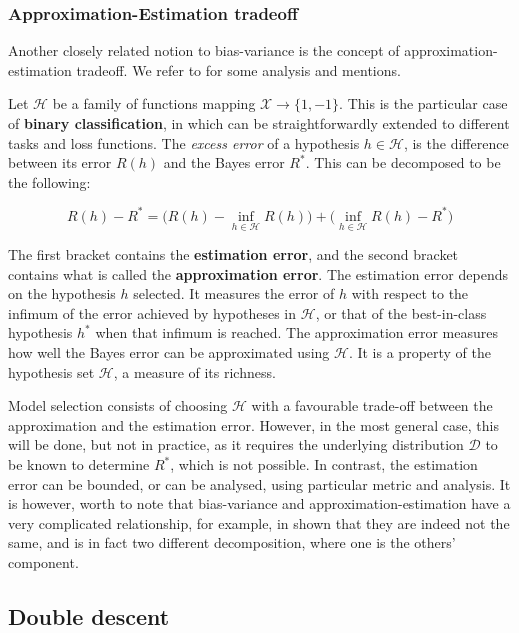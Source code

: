 \documentclass[10pt]{article} %
\begin{document}
\subsubsection{Approximation-Estimation tradeoff}

Another closely related notion to bias-variance is the concept of approximation-estimation tradeoff. We refer to \cite{10.5555/2371238,lafon_understanding_2024} for some analysis and mentions. 

Let $\mathcal{H}$ be a family of functions mapping $\mathcal{X}\to\{1,-1\}$. This is the particular case of \textbf{binary classification}, in which can be straightforwardly extended to different tasks and loss functions. The \textit{excess error} of a hypothesis $h\in\mathcal{H}$, is the difference between its error $R(h)$ and the Bayes error $R^{*}$. This can be decomposed to be the following: 

\begin{equation}
    R(h) - R^{*} = \Big( R(h) - \inf_{h\in \mathcal{H}} R(h) \Big) + \Big( \inf_{h\in \mathcal{H}} R(h) - R^{*} \Big)
\end{equation}

The first bracket contains the \textbf{estimation error}, and the second bracket contains what is called the \textbf{approximation error}. The estimation error depends on the hypothesis $h$ selected. It measures the error of $h$ with respect to the infimum of the error achieved by hypotheses in $\mathcal{H}$, or that of the best-in-class hypothesis $h^{*}$ when that infimum is reached. The approximation error measures how well the Bayes error can be approximated using $\mathcal{H}$. It is a property of the hypothesis set $\mathcal{H}$, a measure of its richness. 

Model selection consists of choosing $\mathcal{H}$ with a favourable trade-off between the approximation and the estimation error. However, in the most general case, this will be done, but not in practice, as it requires the underlying distribution $\mathcal{D}$ to be known to determine $R^{*}$, which is not possible. In contrast, the estimation error can be bounded, or can be analysed, using particular metric and analysis. It is however, worth to note that bias-variance and approximation-estimation have a very complicated relationship, for example, in \cite{brown2024biasvariance} shown that they are indeed not the same, and is in fact two different decomposition, where one is the others' component.

\subsection{Double descent}
\end{document}

